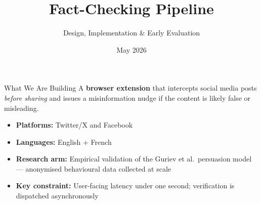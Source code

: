 \documentclass[11pt, aspectratio=169]{beamer}
\title{Fact-Checking Pipeline}
\subtitle{Design, Implementation \& Early Evaluation}
\date{May 2026}
\author{}
\institute{}
\begin{document}
\maketitle

\begin{frame}{What We Are Building}
  A \textbf{browser extension} that intercepts social media posts
  \emph{before sharing} and issues a misinformation nudge if the
  content is likely false or misleading.

  \bigskip
  \begin{itemize}\setlength{\itemsep}{10pt}
    \item \textbf{Platforms:} Twitter/X and Facebook
    \item \textbf{Languages:} English + French
    \item \textbf{Research arm:} Empirical validation of the Guriev et al.\ persuasion model — anonymised behavioural data collected at scale
    \item \textbf{Key constraint:} User-facing latency under one second; verification is dispatched asynchronously
  \end{itemize}
\end{frame}
\end{document}
